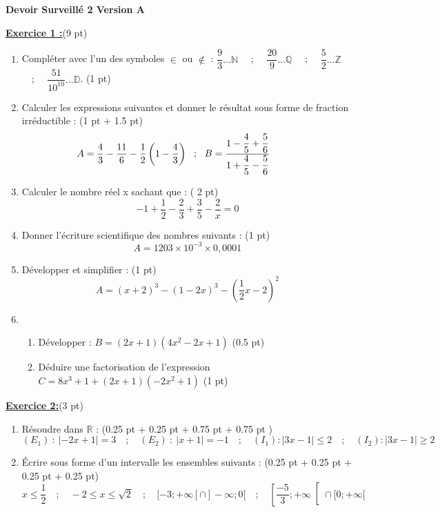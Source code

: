 \documentclass[12pt,a4paper]{article}
\begin{document}
\pagestyle{fancy}
\fancyhf{} %
\fancyfoot[C]{\thepage} %


\begin{center}
    \textbf{\Large  Devoir Surveillé 2 Version A}
\end{center}

\underline{\large\textbf{Exercice 1 :}}(9 pt)
\begin{enumerate}
   \item Compléter avec l'un des symboles $\in$ ou $\not\in$ : $\dfrac{9}{3}\dots \mathbb{N}$ \ \ ; \ \ $\dfrac{20}{9}\dots \mathbb{Q}$ \ \ ; \ \ $\dfrac{5}{2}\dots \mathbb{Z}$ \ \ ; \ \ $\dfrac{51}{10^{10}}\dots \mathbb{D}$. (1 pt)
   \item Calculer les expressions suivantes et donner le résultat sous forme de fraction irréductible : (1 pt + 1.5 pt)
   $$\hspace{-10mm} A = \dfrac{4}{3} - \dfrac{11}{6} - \dfrac{1}{2}\left(1 - \dfrac{4}{3}\right)  \ \ ; \ \ B = \dfrac{1 - \dfrac{4}{5} + \dfrac{5}{6}}{1 + \dfrac{4}{5} - \dfrac{5}{6}}$$
   \item Calculer le nombre réel x sachant que : ( 2 pt)
   $$-1 + \dfrac{1}{2} - \dfrac{2}{3} + \dfrac{3}{5} - \dfrac{2}{x} = 0$$
   \item Donner l’écriture scientifique des nombres suivants : (1 pt)
   $$A = 1203\times 10^{-3}\times 0,0001$$
   \item Développer et simplifier : (1 pt)
   $$A = (x + 2)^3 - (1 - 2x)^3 - \left(\dfrac{1}{2}x - 2\right)^2$$
   \item 
   		\begin{enumerate}
   			\item Développer : $B = (2x + 1)(4x^2 - 2x + 1)$ (0.5 pt)
   			\item Déduire une factorisation de l'expression $C = 8x^3 + 1 + (2x + 1)(-2x^2 + 1)$ (1 pt)
	    \end{enumerate}
   
\end{enumerate}

\underline{\large\textbf{Exercice  2:}}(3 pt)
\begin{enumerate}
	\item Résoudre dans $\mathbb{R}$ : (0.25 pt + 0.25 pt + 0.75 pt  + 0.75 pt )
		$$(E_1) \ : \ |-2x + 1| = 3 \quad ; \quad (E_2) \ : \ |x + 1| = -1 \quad;\quad (I_1) : |3x - 1| \leq 2 \quad;\quad (I_2) : |3x - 1| \geq 2$$
	\item Écrire sous forme d’un intervalle les ensembles suivants : (0.25 pt + 0.25 pt + 0.25 pt + 0.25 pt)
	$$x\leq \dfrac{1}{2} \quad;\quad -2\leq x\leq \sqrt{2} \quad;\quad [-3;+\infty[\cap]-\infty;0[\quad;\quad \left[\dfrac{-5}{3};+\infty\right[\cap [0;+\infty[$$
\end{enumerate}
\end{document}
